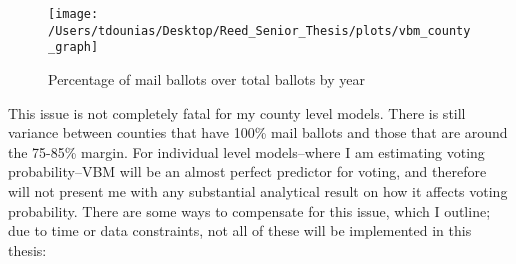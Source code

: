 \documentclass[12pt,twoside]{reedthesis}
\begin{document}
  \begin{figure}
  
  {\centering \texttt{[image: /Users/tdounias/Desktop/Reed\_Senior\_Thesis/plots/vbm\_county\_graph]} 
  
  }
  
  \caption[Percentage of mail ballots over total ballots by year]{Percentage of mail ballots over total ballots by year}\label{fig:vbm png}
  \end{figure}
  
  This issue is not completely fatal for my county level models. There is
  still variance between counties that have 100\% mail ballots and those
  that are around the 75-85\% margin. For individual level models--where I
  am estimating voting probability--VBM will be an almost perfect
  predictor for voting, and therefore will not present me with any
  substantial analytical result on how it affects voting probability.
  There are some ways to compensate for this issue, which I outline; due
  to time or data constraints, not all of these will be implemented in
  this thesis:
  
\end{document}
